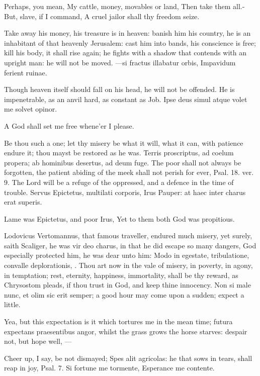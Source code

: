 {Perhaps, you mean,
My cattle, money, movables or land,
Then take them all.-But, slave, if I command,
A cruel jailor shall thy freedom seize.

Take away his money, his treasure is in heaven: banish him his
country, he is an inhabitant of that heavenly Jerusalem: cast him into
bands, his conscience is free; kill his body, it shall rise again; he
fights with a shadow that contends with an upright man: he will not be
moved.
---si fractus illabatur orbis,
Impavidum ferient ruinae.

Though heaven itself should fall on his head, he will not be offended.
He is impenetrable, as an anvil hard, as constant as Job.
Ipse deus simul atque volet me solvet opinor.

A God shall set me free whene'er I please.

Be thou such a one; let thy misery be what it will, what it can, with
patience endure it; thou mayst be restored as he was. Terris
proscriptus, ad coelum propera; ab hominibus desertus, ad deum fuge.
The poor shall not always be forgotten, the patient abiding of the meek
shall not perish for ever, Psal.  18. ver. 9. The Lord will be a
refuge of the oppressed, and a defence in the time of trouble.
Servus Epictetus, multilati corporis, Irus
Pauper: at haec inter charus erat superis.

Lame was Epictetus, and poor Irus,
Yet to them both God was propitious.

Lodovicus Vertomannus, that famous traveller, endured much misery, yet
surely, saith Scaliger, he was vir deo charus, in that he did escape so
many dangers, God especially protected him, he was dear unto him: Modo
in egestate, tribulatione, convalle deplorationis, \etc{}. Thou art now in
the vale of misery, in poverty, in agony, in temptation; rest,
eternity, happiness, immortality, shall be thy reward, as Chrysostom
pleads, if thou trust in God, and keep thine innocency. Non si male
nunc, et olim sic erit semper; a good hour may come upon a sudden;
 expect a little.

Yea, but this expectation is it which tortures me in the mean time;
 futura expectans praesentibus angor, whilst the grass grows the
horse starves: despair not, but hope well,
---

Cheer up, I say, be not dismayed; Spes alit agricolas: he that sows in
tears, shall reap in joy, Psal.  7.
Si fortune me tormente,
Esperance me contente.

}
